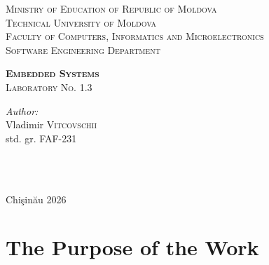 \documentclass[12pt]{article}
\begin{document}
\begin{titlepage}
   \begin{center}
    \textsc{\large Ministry of Education of Republic of Moldova}\\[0.5cm]
    \textsc{\large Technical University of Moldova}\\[0.5cm]
    \textsc{\large Faculty of Computers, Informatics and Microelectronics}\\[0.5cm]
    \textsc{\large Software Engineering Department}\\[1.2cm]

    \vspace{25mm}

    {\LARGE \textbf{\textsc{Embedded Systems}}}\\[0.5cm]
    \textsc{\large Laboratory No. 1.3}\\[0.5cm]

    \newcommand{\HRule}{\rule{\linewidth}{0.5mm}}
    \vspace{80mm}

    \begin{minipage}[t]{0.4\textwidth}
    \begin{flushleft} \large
    \emph{Author:} \\
    Vladimir \textsc{Vitcovschii}\\
    std. gr. FAF-231
    \end{flushleft}
    \end{minipage}
    ~
    \begin{minipage}[t]{0.4\textwidth}
    \begin{flushright} \large
    \end{flushright}
    \end{minipage}\\[3cm]

    \vspace{5mm}
    \large Chi\c{s}in\u{a}u 2026\\[0.5cm]

    \vfill
    \end{center}
\end{titlepage}

\clearpage
\tableofcontents
\clearpage

\setcounter{page}{2}
\pagestyle{fancy}
\fancyhf{}
\rhead{\thepage}

\section{The Purpose of the Work}
\end{document}
